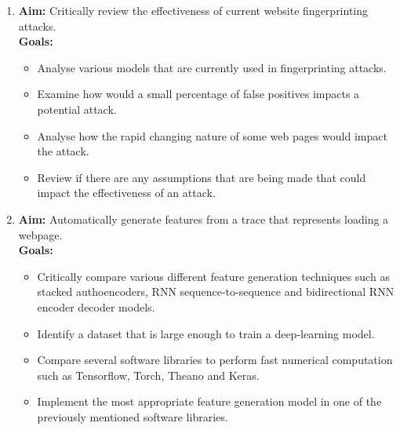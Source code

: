 \begin{enumerate}
   \item \textbf{Aim:} Critically review the effectiveness of current website fingerprinting attacks.\\
   \textbf{Goals:}
   \begin{itemize}
      \item Analyse various models that are currently used in fingerprinting attacks.
      \item Examine how would a small percentage of false positives impacts a potential attack.
      \item Analyse how the rapid changing nature of some web pages would impact the attack.
      \item Review if there are any assumptions that are being made that could impact the effectiveness of an attack.
   \end{itemize}

   \item \textbf{Aim:} Automatically generate features from a trace that represents loading a webpage.\\
   \textbf{Goals:}
   \begin{itemize}
      \item Critically compare various different feature generation techniques such as stacked authoencoders, RNN sequence-to-sequence and bidirectional RNN encoder decoder models.
      \item Identify a dataset that is large enough to train a deep-learning model.
      \item Compare several software libraries to perform fast numerical computation such as Tensorflow, Torch, Theano and Keras.
      \item Implement the most appropriate feature generation model in one of the previously mentioned software libraries.
   \end{itemize}


\end{enumerate}
